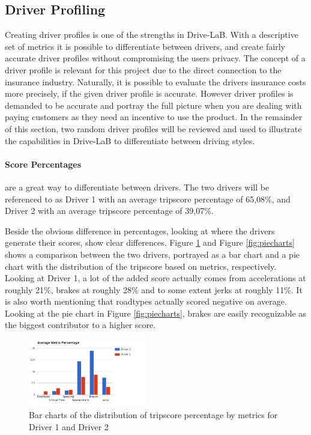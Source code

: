 \subsection{Driver Profiling}\label{subsec:userprofiling}

Creating driver profiles is one of the strengths in Drive-LaB. With a descriptive set of metrics it is possible to differentiate between drivers, and create fairly accurate driver profiles without compromising the users privacy. The concept of a driver profile is relevant for this project due to the direct connection to the insurance industry. Naturally, it is possible to evaluate the drivers insurance costs more precisely, if the given driver profile is accurate. However driver profiles is demanded to be accurate and portray the full picture when you are dealing with paying customers \citep{art:insurtelematics} as they need an incentive to use the product. In the remainder of this section, two random driver profiles will be reviewed and used to illustrate the capabilities in Drive-LaB to differentiate between driving styles.  

\paragraph{Score Percentages} are a great way to differentiate between drivers. The two drivers will be referenced to as Driver 1 with an average tripscore percentage of 65,08\%, and Driver 2 with an average tripscore percentage of 39,07\%.

Beside the obvious difference in percentages, looking at where the drivers generate their scores, show clear differences. Figure \ref{fig:avgmetricper} and Figure \ref{fig:piecharts} shows a comparison between the two drivers, portrayed as a bar chart and a pie chart with the distribution of the tripscore based on metrics, respectively. Looking at Driver 1, a lot of the added score actually comes from accelerations at roughly 21\%, brakes at roughly 28\% and to some extent jerks at roughly 11\%. It is also worth mentioning that roadtypes actually scored negative on average. Looking at the pie chart in Figure \ref{fig:piecharts}, brakes are easily recognizable as the biggest contributor to a higher score.

\begin{figure}[h]
\centering
\includegraphics[width=0.465\textwidth]{Pictures/AverageMetricsPercentage}
\caption{Bar charts of the distribution of tripscore percentage by metrics for Driver 1 and Driver 2}
\label{fig:avgmetricper}
\end{figure}

